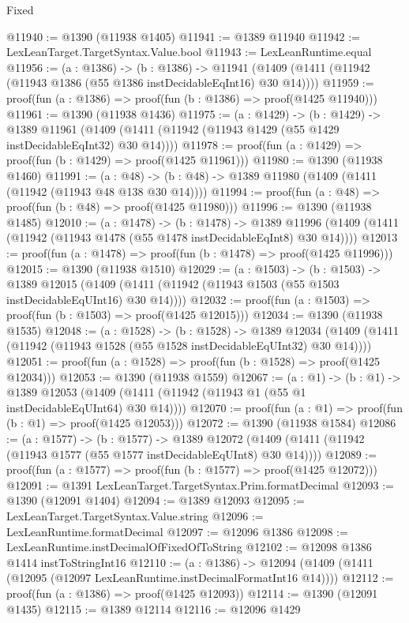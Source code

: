\begin{lexlean}{Fixed}
\begin{coremodule}
@11940 := @1390 (@11938 @1405)
@11941 := @1389 @11940
@11942 := LexLeanTarget.TargetSyntax.Value.bool
@11943 := LexLeanRuntime.equal
@11956 := (a : @1386) ->
  (b : @1386) ->
  @11941 (@1409 (@1411 (@11942 (@11943 @1386 (@55 @1386 instDecidableEqInt16) @30 @14))))
@11959 := proof(fun (a : @1386) => proof(fun (b : @1386) => proof(@1425 @11940)))
@11961 := @1390 (@11938 @1436)
@11975 := (a : @1429) ->
  (b : @1429) ->
  @1389 @11961 (@1409 (@1411 (@11942 (@11943 @1429 (@55 @1429 instDecidableEqInt32) @30 @14))))
@11978 := proof(fun (a : @1429) => proof(fun (b : @1429) => proof(@1425 @11961)))
@11980 := @1390 (@11938 @1460)
@11991 := (a : @48) -> (b : @48) -> @1389 @11980 (@1409 (@1411 (@11942 (@11943 @48 @138 @30 @14))))
@11994 := proof(fun (a : @48) => proof(fun (b : @48) => proof(@1425 @11980)))
@11996 := @1390 (@11938 @1485)
@12010 := (a : @1478) ->
  (b : @1478) ->
  @1389 @11996 (@1409 (@1411 (@11942 (@11943 @1478 (@55 @1478 instDecidableEqInt8) @30 @14))))
@12013 := proof(fun (a : @1478) => proof(fun (b : @1478) => proof(@1425 @11996)))
@12015 := @1390 (@11938 @1510)
@12029 := (a : @1503) ->
  (b : @1503) ->
  @1389 @12015 (@1409 (@1411 (@11942 (@11943 @1503 (@55 @1503 instDecidableEqUInt16) @30 @14))))
@12032 := proof(fun (a : @1503) => proof(fun (b : @1503) => proof(@1425 @12015)))
@12034 := @1390 (@11938 @1535)
@12048 := (a : @1528) ->
  (b : @1528) ->
  @1389 @12034 (@1409 (@1411 (@11942 (@11943 @1528 (@55 @1528 instDecidableEqUInt32) @30 @14))))
@12051 := proof(fun (a : @1528) => proof(fun (b : @1528) => proof(@1425 @12034)))
@12053 := @1390 (@11938 @1559)
@12067 := (a : @1) ->
  (b : @1) ->
  @1389 @12053 (@1409 (@1411 (@11942 (@11943 @1 (@55 @1 instDecidableEqUInt64) @30 @14))))
@12070 := proof(fun (a : @1) => proof(fun (b : @1) => proof(@1425 @12053)))
@12072 := @1390 (@11938 @1584)
@12086 := (a : @1577) ->
  (b : @1577) ->
  @1389 @12072 (@1409 (@1411 (@11942 (@11943 @1577 (@55 @1577 instDecidableEqUInt8) @30 @14))))
@12089 := proof(fun (a : @1577) => proof(fun (b : @1577) => proof(@1425 @12072)))
@12091 := @1391 LexLeanTarget.TargetSyntax.Prim.formatDecimal
@12093 := @1390 (@12091 @1404)
@12094 := @1389 @12093
@12095 := LexLeanTarget.TargetSyntax.Value.string
@12096 := LexLeanRuntime.formatDecimal
@12097 := @12096 @1386
@12098 := LexLeanRuntime.instDecimalOfFixedOfToString
@12102 := @12098 @1386 @1414 instToStringInt16
@12110 := (a : @1386) -> @12094 (@1409 (@1411 (@12095 (@12097 LexLeanRuntime.instDecimalFormatInt16 @14))))
@12112 := proof(fun (a : @1386) => proof(@1425 @12093))
@12114 := @1390 (@12091 @1435)
@12115 := @1389 @12114
@12116 := @12096 @1429

\end{coremodule}
\end{lexlean}
